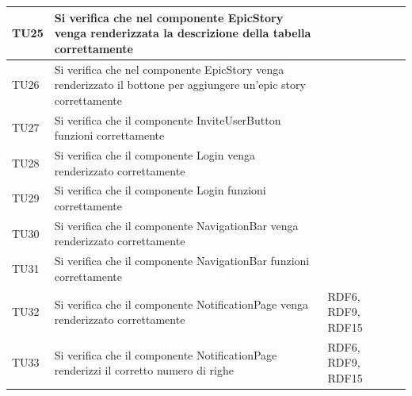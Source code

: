 \documentclass{article}
\begin{document}
\begin{center}
\begin{tabular}{P{5em} P{21em} P{6em} P{6em}}
    TU25 & Si verifica che nel componente EpicStory venga renderizzata la descrizione della tabella correttamente &  & \\
    \hline{}
     TU26 & Si verifica che nel componente EpicStory venga renderizzato il bottone per aggiungere un'epic story correttamente &  & \\
    \hline
    TU27 &  Si verifica che il componente InviteUserButton funzioni correttamente &  & \\
    \hline{}
     TU28 & Si verifica che il componente Login venga renderizzato correttamente  &  & \\
    \hline
    TU29&Si verifica che il componente Login funzioni correttamente &  & \\
    \hline{}
     TU30 & Si verifica che il componente NavigationBar venga renderizzato correttamente   &  & \\
    \hline
    TU31&Si verifica che il componente NavigationBar funzioni correttamente &   & \\
    \hline{}
     TU32 &  Si verifica che il componente NotificationPage venga renderizzato correttamente  & RDF6, RDF9, RDF15  & \\
    \hline
    TU33& Si verifica che il componente NotificationPage renderizzi il corretto numero di righe& RDF6, RDF9, RDF15   & \\
    
    \hline
     \end{tabular}
        \end{center}
\end{document}

